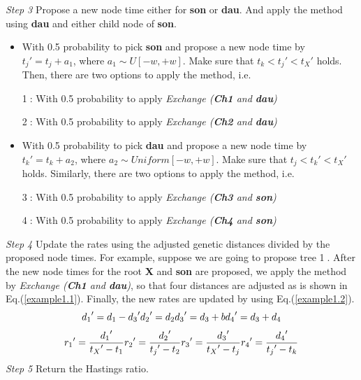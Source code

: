 \documentclass{bmcart}
\begin{document}
\emph{Step 3} Propose a new node time either for \textbf{son} or \textbf{dau}. And apply the method using \textbf{dau} and either child node of \textbf{son}.
\begin{itemize}
\item With 0.5 probability to pick \textbf{son} and propose a new node time by ${t_j}' = {t_j} + {a_1}$, where ${a_1} \sim U[ - w, + w]$. Make sure that ${t_k} < {t_j}' < {t_X}'$ holds. Then, there are two options to apply the method, i.e.

\textcircled1: With 0.5 probability to apply \textit{Exchange (\textbf{Ch1} and \textbf{dau})}

\textcircled2: With 0.5 probability to apply \textit{Exchange (\textbf{Ch2} and \textbf{dau})}

\item With 0.5 probability to pick \textbf{dau} and propose a new node time by ${t_k}' = {t_k} + {a_2}$, where ${a_2} \sim Uniform[ - w, + w]$. Make sure that ${t_j} < {t_k}' < {t_X}'$ holds. Similarly, there are two options to apply the method, i.e.

\textcircled3: With 0.5 probability to apply \textit{Exchange (\textbf{Ch3} and \textbf{son})}

\textcircled4: With 0.5 probability to apply \textit{Exchange (\textbf{Ch4} and \textbf{son})}
\end{itemize}

\emph{Step 4}  Update the rates using the adjusted genetic distances divided by the proposed node times. For example, suppose we are going to propose tree \textcircled1. After the new node times for the root \textbf{X} and \textbf{son} are proposed, we apply the method by \textit{Exchange (\textbf{Ch1} and \textbf{dau})}, so that four distances are adjusted as is shown in Eq.(\ref{example1.1}). Finally, the new rates are updated by using Eq.(\ref{example1.2}).
\begin{equation}\label{example1.1}
{d_1}' = {d_1} - {d_3}'  \\
{d_2}' = {d_2} \\
{d_3}' = {d_3} + b \\
{d_4}' = {d_3} + {d_4}
\end{equation}
\begin{equation}\label{example1.2}
{r_1}' = \frac{{{d_1}'}}{{{t_X}' - {t_1}}} \\
{r_2}' = \frac{{{d_2}'}}{{{t_j}' - {t_2}}} \\
{r_3}' = \frac{{{d_3}'}}{{{t_X}' - {t_j}}} \\
{r_4}' = \frac{{{d_4}'}}{{{t_j}' - {t_k}}} 
\end{equation}
\emph{Step 5} Return the Hastings ratio.
\end{document}

